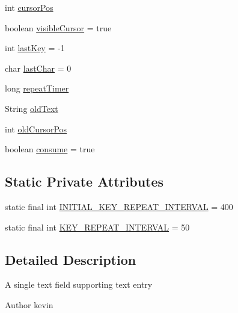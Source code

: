 \begin{DoxyCompactItemize}
\item 
int \mbox{\hyperlink{classorg_1_1newdawn_1_1slick_1_1gui_1_1_text_field_a05994000bb672a1f49a9a8ee30ced3e5}{cursor\+Pos}}
\item 
boolean \mbox{\hyperlink{classorg_1_1newdawn_1_1slick_1_1gui_1_1_text_field_af9a8a737887d06968db25185b999f5d0}{visible\+Cursor}} = true
\item 
int \mbox{\hyperlink{classorg_1_1newdawn_1_1slick_1_1gui_1_1_text_field_a892f3c9dde2258a7d46f300df3955c64}{last\+Key}} = -\/1
\item 
char \mbox{\hyperlink{classorg_1_1newdawn_1_1slick_1_1gui_1_1_text_field_af5e6091cdd7ef96924323f5654e1fa2c}{last\+Char}} = 0
\item 
long \mbox{\hyperlink{classorg_1_1newdawn_1_1slick_1_1gui_1_1_text_field_a8ebdae0e20721cff3acfe6319c492f24}{repeat\+Timer}}
\item 
String \mbox{\hyperlink{classorg_1_1newdawn_1_1slick_1_1gui_1_1_text_field_a9f52b9f250dde2673cc5063348508375}{old\+Text}}
\item 
int \mbox{\hyperlink{classorg_1_1newdawn_1_1slick_1_1gui_1_1_text_field_aeb272b81f1df084f3c001e91aac5ca37}{old\+Cursor\+Pos}}
\item 
boolean \mbox{\hyperlink{classorg_1_1newdawn_1_1slick_1_1gui_1_1_text_field_a6e09e0dd0d37b70c964a29f949a4c7f9}{consume}} = true
\end{DoxyCompactItemize}
\subsection*{Static Private Attributes}
\begin{DoxyCompactItemize}
\item 
static final int \mbox{\hyperlink{classorg_1_1newdawn_1_1slick_1_1gui_1_1_text_field_add7d5aa4a0cdd8c417a1c1fa61d33fd6}{I\+N\+I\+T\+I\+A\+L\+\_\+\+K\+E\+Y\+\_\+\+R\+E\+P\+E\+A\+T\+\_\+\+I\+N\+T\+E\+R\+V\+AL}} = 400
\item 
static final int \mbox{\hyperlink{classorg_1_1newdawn_1_1slick_1_1gui_1_1_text_field_a50e8e02a98fe36e8b3847ac42bc8ee34}{K\+E\+Y\+\_\+\+R\+E\+P\+E\+A\+T\+\_\+\+I\+N\+T\+E\+R\+V\+AL}} = 50
\end{DoxyCompactItemize}


\subsection{Detailed Description}
A single text field supporting text entry

\begin{DoxyAuthor}{Author}
kevin 
\end{DoxyAuthor}



